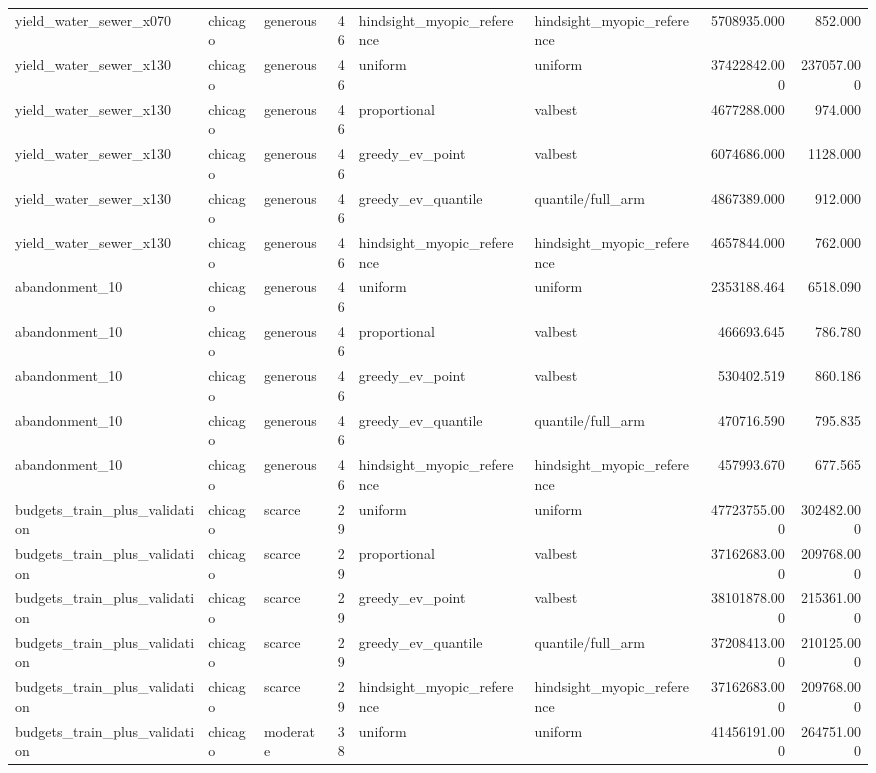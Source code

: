 \begin{tabular}{lllrllrr}
yield\_water\_sewer\_x070 & chicago & generous & 46 & hindsight\_myopic\_reference & hindsight\_myopic\_reference & 5708935.000 & 852.000 \\
yield\_water\_sewer\_x130 & chicago & generous & 46 & uniform & uniform & 37422842.000 & 237057.000 \\
yield\_water\_sewer\_x130 & chicago & generous & 46 & proportional & valbest & 4677288.000 & 974.000 \\
yield\_water\_sewer\_x130 & chicago & generous & 46 & greedy\_ev\_point & valbest & 6074686.000 & 1128.000 \\
yield\_water\_sewer\_x130 & chicago & generous & 46 & greedy\_ev\_quantile & quantile/full\_arm & 4867389.000 & 912.000 \\
yield\_water\_sewer\_x130 & chicago & generous & 46 & hindsight\_myopic\_reference & hindsight\_myopic\_reference & 4657844.000 & 762.000 \\
abandonment\_10 & chicago & generous & 46 & uniform & uniform & 2353188.464 & 6518.090 \\
abandonment\_10 & chicago & generous & 46 & proportional & valbest & 466693.645 & 786.780 \\
abandonment\_10 & chicago & generous & 46 & greedy\_ev\_point & valbest & 530402.519 & 860.186 \\
abandonment\_10 & chicago & generous & 46 & greedy\_ev\_quantile & quantile/full\_arm & 470716.590 & 795.835 \\
abandonment\_10 & chicago & generous & 46 & hindsight\_myopic\_reference & hindsight\_myopic\_reference & 457993.670 & 677.565 \\
budgets\_train\_plus\_validation & chicago & scarce & 29 & uniform & uniform & 47723755.000 & 302482.000 \\
budgets\_train\_plus\_validation & chicago & scarce & 29 & proportional & valbest & 37162683.000 & 209768.000 \\
budgets\_train\_plus\_validation & chicago & scarce & 29 & greedy\_ev\_point & valbest & 38101878.000 & 215361.000 \\
budgets\_train\_plus\_validation & chicago & scarce & 29 & greedy\_ev\_quantile & quantile/full\_arm & 37208413.000 & 210125.000 \\
budgets\_train\_plus\_validation & chicago & scarce & 29 & hindsight\_myopic\_reference & hindsight\_myopic\_reference & 37162683.000 & 209768.000 \\
budgets\_train\_plus\_validation & chicago & moderate & 38 & uniform & uniform & 41456191.000 & 264751.000 \\

\end{tabular}
